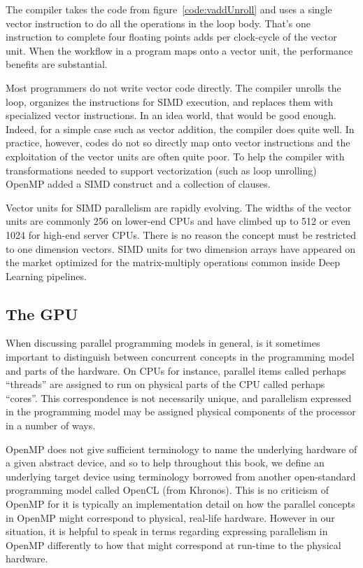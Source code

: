 The compiler takes the code from figure~\ref{code:vaddUnroll} and uses a single vector instruction 
to do all the operations in the loop body.   That's one instruction to complete four floating points adds
per clock-cycle of the vector unit.  When the workflow in a program maps onto a vector unit, the performance 
benefits are substantial.

Most programmers do not write vector code directly.  The compiler unrolls the loop, organizes the instructions for SIMD
execution, and replaces them with specialized vector instructions.  In an idea world, that would be good enough. Indeed,
for a simple case such as vector addition, the compiler does quite well.  In practice, however, codes do not so directly map
onto vector instructions and the exploitation of the vector units are often quite poor.
To help the compiler with transformations needed to support vectorization (such as loop unrolling) OpenMP added
a SIMD construct and a collection of clauses.  

Vector units for SIMD parallelism are rapidly evolving.  The widths of the vector units are commonly 256 on lower-end
CPUs and have climbed up to 512 or even 1024 for high-end server CPUs.  There is no reason the concept must 
be restricted to one dimension vectors.   SIMD units for two dimension arrays have appeared on the market optimized
for the matrix-multiply operations common inside Deep Learning pipelines. 


\subsection{The GPU}

%
%
When discussing parallel programming models in general, is it sometimes important to distinguish between concurrent concepts in the programming model and parts of the hardware.
On CPUs for instance, parallel items called perhaps ``threads'' are assigned to run on physical parts of the CPU called perhaps ``cores''.
This correspondence is not necessarily unique, and parallelism expressed in the programming model may be assigned physical components of the processor in a number of ways.

OpenMP does not give sufficient terminology to name the underlying hardware of a given abstract device, and so to help throughout this book, we define an underlying target device using terminology borrowed from another open-standard programming model called OpenCL (from Khronos).
This is no criticism of OpenMP for it is typically an implementation detail on how the parallel concepts in OpenMP might correspond to physical, real-life hardware.
However in our situation, it is helpful to speak in terms regarding expressing parallelism in OpenMP differently to how that might correspond at run-time to the physical hardware.

